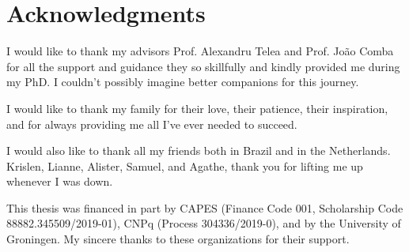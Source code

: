 \manualmark
{} %

\begingroup
\let\clearpage\relax
\let\cleardoublepage\relax
\let\cleardoublepage\relax

\chapter*{Acknowledgments}

I would like to thank my advisors Prof. Alexandru Telea and Prof. Jo\~{a}o Comba for all the support and guidance they so skillfully and kindly provided me during my PhD. I couldn't possibly imagine better companions for this journey.

I would like to thank my family for their love, their patience, their inspiration, and for always providing me all I've ever needed to succeed.

I would also like to thank all my friends both in Brazil and in the Netherlands. Krislen, Lianne, Alister, Samuel, and Agathe, thank you for lifting me up whenever I was down.


\bigbreak

This thesis was financed in part by CAPES (Finance Code 001, Scholarship Code 88882.345509/2019-01), CNPq (Process 304336/2019-0), and by the University of Groningen. 
My sincere thanks to these organizations for their support.

\endgroup



